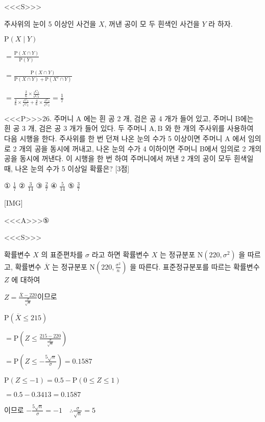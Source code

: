 \documentclass{oblivoir}
\begin{document}
<<<S>>>



주사위의 눈이 5 이상인 사건을 $X$, 꺼낸 공이 모 두 흰색인 사건을 $Y$ 라 하자.

$\mathrm{P}(X \mid Y) $

$=\frac{\mathrm{P}(X \cap Y)}{\mathrm{P}(Y)}$

$=\frac{\mathrm{P}(X \cap Y)}{\mathrm{P}(X \cap Y)+\mathrm{P}\left(X^{c} \cap Y\right)}$

$=\frac{\frac{2}{6} \times \frac{{ }_{2} \mathrm{C}_{2}}{{ }_{6} \mathrm{C}_{2}}}{\frac{2}{6} \times \frac{{ }_{2} \mathrm{C}_{2}}{{ }_{6} \mathrm{C}_{2}}+\frac{4}{6} \times \frac{{ }_{3} \mathrm{C}_{2}}{{ }_{6} \mathrm{C}_{2}}}=\frac{1}{7}$


<<<P>>>26. 주머니 $\mathrm{A}$ 에는 흰 공 2 개, 검은 공 4 개가 들어 있고, 주머니 B에는 흰 공 3 개, 검은 공 3 개가 들어 있다.
두 주머니 $\mathrm{A}, \mathrm{B}$ 와 한 개의 주사위를 사용하여 다음 시행을 한다.
주사위를 한 번 던져
나온 눈의 수가 5 이상이면
주머니 $\mathrm{A}$ 에서 임의로 2 개의 공을 동시에 꺼내고,
나온 눈의 수가 4 이하이면
주머니 B에서 임의로 2 개의 공을 동시에 꺼낸다.
이 시행을 한 번 하여 주머니에서 꺼낸 2 개의 공이 모두 흰색일 때, 나온 눈의 수가 5 이상일 확률은? [3점]

① $\frac{1}{7}$
② $\frac{3}{14}$
③ $\frac{2}{7}$
④ $\frac{5}{14}$
⑤ $\frac{3}{7}$

[IMG]

<<<A>>>⑤

<<<S>>>



확률변수 $X$ 의 표준편차를 $\sigma$ 라고 하면
확률변수 $X$ 는 정규분포 $\mathrm{N}\left(220, \sigma^{2}\right)$ 을 따르고,
확률변수 $\overline{X}$ 는 정규분포 $\mathrm{N}\left(220, \frac{\sigma^{2}}{n}\right)$ 을 따른다.
표준정규분포를 따르는 확률변수 $Z$ 에 대하여

$Z=\frac{\overline{X}-220}{\frac{\sigma}{\sqrt{n}}}$이므로

$\mathrm{P}(\overline{X} \leq 215) $

$=\mathrm{P}\left(Z \leq \frac{215-220}{\frac{\sigma}{\sqrt{n}}}\right)$

$=\mathrm{P}\left(Z \leq-\frac{5 \sqrt{n}}{\sigma}\right)=0.1587$

$\mathrm{P}(Z \leq-1)=0.5-\mathrm{P}(0 \leq Z \leq 1)$

$= 0.5-0.3413=0.1587$

이므로 $-\frac{5 \sqrt{n}}{\sigma}=-1 \quad \therefore \frac{\sigma}{\sqrt{n}}=5$
\end{document}
